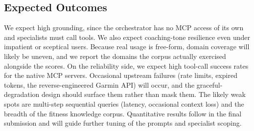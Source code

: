 \subsection{Expected Outcomes}\label{sec:evaluation:expected}

We expect high grounding, since the orchestrator has no MCP access of its own and specialists must call tools. We also expect coaching-tone resilience even under impatient or sceptical users. Because real usage is free-form, domain coverage will likely be uneven, and we report the domains the corpus actually exercised alongside the scores. On the reliability side, we expect high tool-call success rates for the native MCP servers. Occasional upstream failures (rate limits, expired tokens, the reverse-engineered Garmin API) will occur, and the graceful-degradation design should surface them rather than mask them. The likely weak spots are multi-step sequential queries (latency, occasional context loss) and the breadth of the fitness knowledge corpus. Quantitative results follow in the final submission and will guide further tuning of the prompts and specialist scoping.

